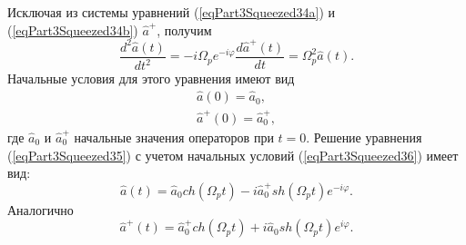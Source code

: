 Исключая из системы уравнений (\ref{eqPart3Squeezed34a}) и
(\ref{eqPart3Squeezed34b}) $\hat{a}^{+}$, получим
\begin{equation}
\frac{d^2\hat{a}\left(t\right)}{dt^2} = 
- i \Omega_p e^{- i \varphi}
\frac{d\hat{a}^{+}\left(t\right)}{dt} = 
\Omega_p^2\hat{a}\left(t\right).
\label{eqPart3Squeezed35}
\end{equation}
Начальные условия для этого уравнения имеют вид
\begin{eqnarray}
\hat{a}\left(0\right) = \hat{a}_0, 
\nonumber \\
\hat{a}^{+}\left(0\right) = \hat{a}^{+}_0, 
\label{eqPart3Squeezed36}
\end{eqnarray}
где $\hat{a}_0$ и $\hat{a}^{+}_0$ начальные значения операторов при $t
= 0$. Решение уравнения (\ref{eqPart3Squeezed35}) с учетом начальных
условий (\ref{eqPart3Squeezed36}) имеет вид:
\begin{equation}
\hat{a}\left(t\right) = \hat{a}_0 ch \left(\Omega_p t \right) - 
i \hat{a}^{+}_0 sh \left(\Omega_p t\right) e^{-i \varphi}.
\label{eqPart3Squeezed37a}
\end{equation}
Аналогично
\begin{equation}
\hat{a}^{+}\left(t\right) = \hat{a}^{+}_0 ch \left(\Omega_p t \right) +
i \hat{a}_0 sh \left(\Omega_p t\right) e^{i \varphi}.
\label{eqPart3Squeezed37b}
\end{equation}



